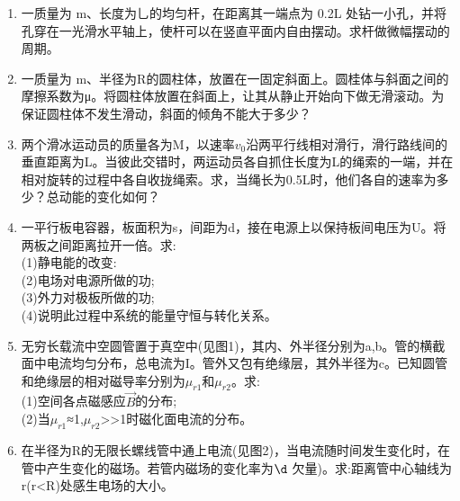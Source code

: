 \begin{enumerate}
\item 一质量为 m、长度为乚的均匀杆，在距离其一端点为 0.2L 处钻一小孔，并将孔穿在一光滑水平轴上，使杆可以在竖直平面内自由摆动。求杆做微幅摆动的周期。
\item 一质量为 m、半径为R的圆柱体，放置在一固定斜面上。圆桂体与斜面之间的摩擦系数为μ。将圆柱体放置在斜面上，让其从静止开始向下做无滑滚动。为保证圆柱体不发生滑动，斜面的倾角不能大于多少？
\item 两个滑冰运动员的质量各为M，以速率$v_0$沿两平行线相对滑行，滑行路线间的垂直距离为L。当彼此交错时，两运动员各自抓住长度为L的绳索的一端，并在相对旋转的过程中各自收拢绳索。求，当绳长为0.5L时，他们各自的速率为多少？总动能的变化如何？
\item 一平行板电容器，板面积为s，间距为d，接在电源上以保持板间电压为U。将两板之间距离拉开一倍。求:\\(1)静电能的改变:\\(2)电场对电源所做的功;\\(3)外力对极板所做的功;\\(4)说明此过程中系统的能量守恒与转化关系。
\item 无穷长载流中空圆管置于真空中(见图1)，其内、外半径分别为a,b。管的横截面中电流均匀分布，总电流为I。管外又包有绝缘层，其外半径为c。已知圆管和绝缘层的相对磁导率分别为$\mu_{r1}$和$\mu_{r2}$。求:\\
(1)空间各点磁感应$\vec B$的分布;\\
(2)当$\mu_{r1}$≈1,$\mu_{r2}$>>1时磁化面电流的分布。
\item 在半径为R的无限长螺线管中通上电流(见图2)，当电流随时间发生变化时，在管中产生变化的磁场。若管内磁场的变化率为$\d$
欠量)。求:距离管中心轴线为r(r<R)处感生电场的大小。
\end{enumerate}


